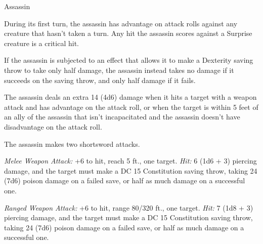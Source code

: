 \documentclass[10pt,a4paper,twoside,bg=none,twocolumn,openany,nodeprecatedcode]{dndbook}
\begin{document}
\begin{DndMonster}[float=t]{Assassin}
\DndMonsterBasics[
armor-class = {15 (studded leather armor)},
hit-points = {\DndDice{12d8 + 24}},
speed = {30 ft.}
]
\DndMonsterAbilityScores[
 str = 11,
 dex = 16,
 con = 14,
 int = 13,
 wis = 11,
 cha = 10
]
\DndMonsterDetails[
saving-throws = {Dex +6, Int +4},
skills = {Acrobatics +6, Deception +3, Perception +3, Stealth +9},
damage-resistances = {poison},
languages = {Thieves' cant plus any two languages},
challenge = 8,
]
During its first turn, the assassin has advantage on attack rolls against any creature that hasn't taken a turn. Any hit the assassin scores against a Surprise creature is a critical hit.

If the assassin is subjected to an effect that allows it to make a Dexterity saving throw to take only half damage, the assassin instead takes no damage if it succeeds on the saving throw, and only half damage if it fails.

The assassin deals an extra 14 (4d6) damage when it hits a target with a weapon attack and has advantage on the attack roll, or when the target is within 5 feet of an ally of the assassin that isn't incapacitated and the assassin doesn't have disadvantage on the attack roll.

\par
{}
The assassin makes two shortsword attacks.

\textsl{Melee Weapon Attack:} +6 to hit, reach 5 ft., one target. \textsl{Hit:} 6 (1d6 + 3) piercing damage, and the target must make a DC 15 Constitution saving throw, taking 24 (7d6) poison damage on a failed save, or half as much damage on a successful one.

\textsl{Ranged Weapon Attack:} +6 to hit, range 80/320 ft., one target. \textsl{Hit:} 7 (1d8 + 3) piercing damage, and the target must make a DC 15 Constitution saving throw, taking 24 (7d6) poison damage on a failed save, or half as much damage on a successful one.

\end{DndMonster}
\end{document}
